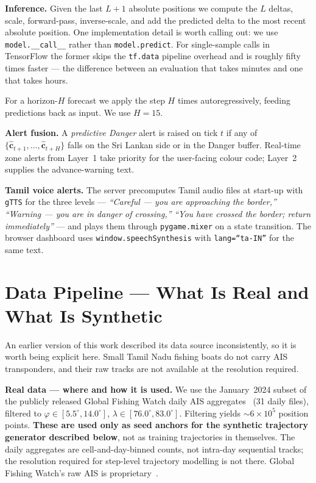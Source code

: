 \documentclass[conference]{IEEEtran}
\begin{document}
\textbf{Inference.} Given the last $L+1$ absolute positions we compute the $L$ deltas, scale, forward-pass, inverse-scale, and add the predicted delta to the most recent absolute position. One implementation detail is worth calling out: we use \texttt{model.\_\_call\_\_} rather than \texttt{model.predict}. For single-sample calls in TensorFlow the former skips the \texttt{tf.data} pipeline overhead and is roughly fifty times faster --- the difference between an evaluation that takes minutes and one that takes hours.

For a horizon-$H$ forecast we apply the step $H$ times autoregressively, feeding predictions back as input. We use $H = 15$.

\textbf{Alert fusion.} A \emph{predictive Danger} alert is raised on tick $t$ if any of $\{\hat{\mathbf{c}}_{t+1}, \ldots, \hat{\mathbf{c}}_{t+H}\}$ falls on the Sri Lankan side or in the Danger buffer. Real-time zone alerts from Layer~1 take priority for the user-facing colour code; Layer~2 supplies the advance-warning text.

\textbf{Tamil voice alerts.} The server precomputes Tamil audio files at start-up with \texttt{gTTS} for the three levels --- \emph{``Careful --- you are approaching the border,''} \emph{``Warning --- you are in danger of crossing,''} \emph{``You have crossed the border; return immediately''} --- and plays them through \texttt{pygame.mixer} on a state transition. The browser dashboard uses \texttt{window.speechSynthesis} with \texttt{lang=``ta-IN''} for the same text.

\section{Data Pipeline --- What Is Real and What Is Synthetic}\label{sec:data}

An earlier version of this work described its data source inconsistently, so it is worth being explicit here. Small Tamil Nadu fishing boats do not carry AIS transponders, and their raw tracks are not available at the resolution required.

\textbf{Real data --- where and how it is used.} We use the January~2024 subset of the publicly released Global Fishing Watch daily AIS aggregates~\cite{kroodsma2018,gfw_dataset} (31 daily files), filtered to $\varphi \in [5.5^\circ, 14.0^\circ]$, $\lambda \in [76.0^\circ, 83.0^\circ]$. Filtering yields $\sim 6{\times}10^5$ position points. \textbf{These are used only as seed anchors for the synthetic trajectory generator described below}, not as training trajectories in themselves. The daily aggregates are cell-and-day-binned counts, not intra-day sequential tracks; the resolution required for step-level trajectory modelling is not there. Global Fishing Watch's raw AIS is proprietary~\cite{gfw_dataset}.
\end{document}
